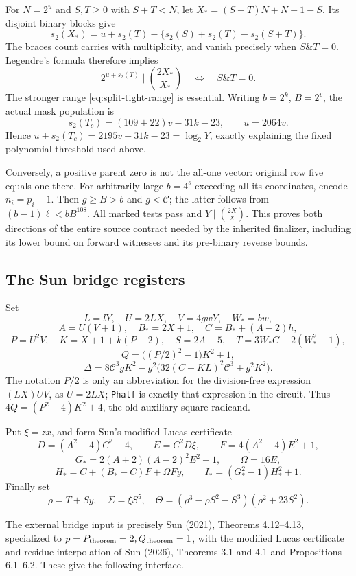 For $N=2^u$ and $S,T\ge0$ with $S+T<N$, let
$X_*=(S+T)N+N-1-S$. Its disjoint binary blocks give
\[
 s_2(X_*)=u+s_2(T)-\{s_2(S)+s_2(T)-s_2(S+T)\}.
\]
The braces count carries with multiplicity, and vanish precisely when
$S\mathbin{\&}T=0$. Legendre's formula therefore implies
\[
 2^{u+s_2(T)}\mid\binom{2X_*}{X_*}
 \quad\Longleftrightarrow\quad S\mathbin{\&}T=0.
\]
The stronger range \eqref{eq:split-tight-range} is essential.
Writing $b=2^k$, $B=2^v$, the actual mask population is
\[
 s_2(T_c)=(109+22)v-31k-23,\qquad u=2064v.
\]
Hence $u+s_2(T_c)=2195v-31k-23=\log_2Y$, exactly explaining the
fixed polynomial threshold used above.

Conversely, a positive parent zero is not the all-one vector: original
row five equals one there. For arbitrarily large $b=4^s$ exceeding all
its coordinates, encode $n_i=p_i-1$. Then $g\ge B>b$ and $g<\mathcal C$;
the latter follows from $(b-1)\ell<bB^{108}$. All marked tests pass and
$Y\mid\binom{2X}{X}$. This proves both directions of the entire source
contract needed by the inherited finalizer, including its lower bound on
forward witnesses and its pre-binary reverse bounds.

\subsection{The Sun bridge registers}\label{the-sun-bridge-registers}

Set \[
 L=lY,\quad U=2LX,\quad V=4gwY,\quad W_*=bw,
\] \[
 A=U(V+1),\quad B_*=2X+1,\quad C=B_*+(A-2)h,
\] \[
 P=U^2V,\quad K=X+1+k(P-2),\quad
 S=2A-5,\quad T=3W_*C-2(W_*^2-1),
\] \[
 Q=\bigl((P/2)^2-1\bigr)K^2+1,
\] \[
 \Delta=8\mathcal C^3gK^2-
 g^2\bigl(32(C-KL)^2\mathcal C^3+g^2K^2\bigr).
\] The notation \(P/2\) is only an abbreviation for the division-free
expression \((LX)UV\), as \(U=2LX\); \texttt{Phalf} is exactly that
expression in the circuit. Thus \(4Q=(P^2-4)K^2+4\), the old auxiliary
square radicand.

Put \(\xi=zx\), and form Sun's modified Lucas certificate \[
 D=(A^2-4)C^2+4,\qquad E=C^2D\xi,\qquad
 F=4(A^2-4)E^2+1,
\] \[
 G_*=2(A+2)(A-2)^2E^2-1,\qquad \Omega=16E,
\] \[
 H_*=C+(B_*-C)F+\Omega Fy,\qquad I_*=(G_*^2-1)H_*^2+1.
\] Finally set \[
 \rho=T+Sy,\quad \Sigma=\xi S^5,\quad
 \Theta=(\rho^3-\rho S^2-S^3)(\rho^2+23S^2).
\]

The external bridge input is precisely Sun (2021), Theorems 4.12--4.13,
specialized to \(p=P_{\rm theorem}=2,Q_{\rm theorem}=1\), with the
modified Lucas certificate and residue interpolation of Sun (2026),
Theorems 3.1 and 4.1 and Propositions 6.1--6.2. These give the following
interface.

